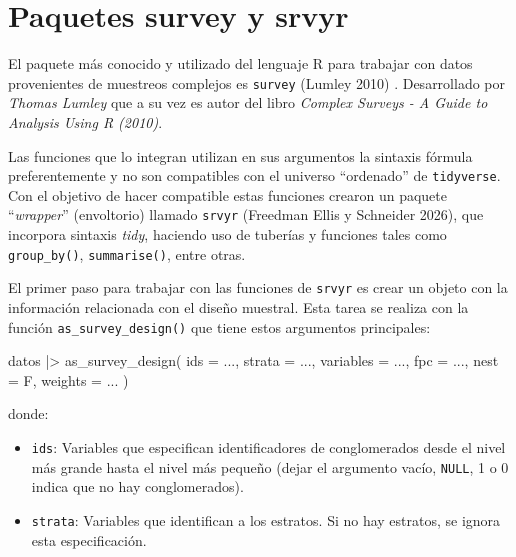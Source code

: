 \documentclass[
  spanish,
  a4paper,
]{scrbook}
\newenvironment{Shaded}{\begin{snugshade}}{\end{snugshade}}
\newcommand{\AttributeTok}[1]{\textcolor[rgb]{0.40,0.45,0.13}{#1}}
\newcommand{\FunctionTok}[1]{\textcolor[rgb]{0.28,0.35,0.67}{#1}}
\newcommand{\NormalTok}[1]{\textcolor[rgb]{0.00,0.23,0.31}{#1}}
\newcommand{\SpecialCharTok}[1]{\textcolor[rgb]{0.37,0.37,0.37}{#1}}
\begin{document}
\section{Paquetes survey y srvyr}\label{paquetes-survey-y-srvyr}

El paquete más conocido y utilizado del lenguaje R para trabajar con
datos provenientes de muestreos complejos es \texttt{survey} (Lumley
2010) . Desarrollado por \emph{Thomas Lumley} que a su vez es autor del
libro \emph{Complex Surveys - A Guide to Analysis Using R (2010)}.

Las funciones que lo integran utilizan en sus argumentos la sintaxis
fórmula preferentemente y no son compatibles con el universo
``ordenado'' de \texttt{tidyverse}. Con el objetivo de hacer compatible
estas funciones crearon un paquete ``\emph{wrapper}'' (envoltorio)
llamado \texttt{srvyr} (Freedman Ellis y Schneider 2026), que incorpora
sintaxis \emph{tidy}, haciendo uso de tuberías y funciones tales como
\texttt{group\_by()}, \texttt{summarise()}, entre otras.

El primer paso para trabajar con las funciones de \texttt{srvyr} es
crear un objeto con la información relacionada con el diseño muestral.
Esta tarea se realiza con la función \texttt{as\_survey\_design()} que
tiene estos argumentos principales:

\begin{Shaded}
\begin{Highlighting}[]
\NormalTok{datos }\SpecialCharTok{|\textgreater{}}
  \FunctionTok{as\_survey\_design}\NormalTok{(}
    \AttributeTok{ids =}\NormalTok{ ...,}
    \AttributeTok{strata =}\NormalTok{ ...,}
    \AttributeTok{variables =}\NormalTok{ ...,}
    \AttributeTok{fpc =}\NormalTok{ ...,}
    \AttributeTok{nest =}\NormalTok{ F,}
    \AttributeTok{weights =}\NormalTok{ ...}
\NormalTok{  )}
\end{Highlighting}
\end{Shaded}

donde:

\begin{itemize}
\item
  \texttt{ids}: Variables que especifican identificadores de
  conglomerados desde el nivel más grande hasta el nivel más pequeño
  (dejar el argumento vacío, \texttt{NULL}, 1 o 0 indica que no hay
  conglomerados).
\item
  \texttt{strata}: Variables que identifican a los estratos. Si no hay
  estratos, se ignora esta especificación.
\end{itemize}
\end{document}
